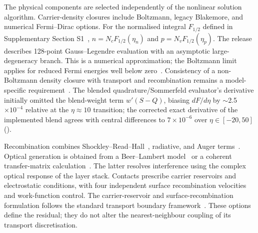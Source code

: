 The physical components are selected independently of the nonlinear
solution algorithm. Carrier-density closures include Boltzmann, legacy
Blakemore, and numerical Fermi--Dirac options. For the normalised integral
$F_{1/2}$ defined in Supplementary Section S1~\cite{dlmf,blakemore1982},
$n=N_cF_{1/2}(\eta_n)$ and $p=N_vF_{1/2}(\eta_p)$.
The release describes 128-point Gauss--Legendre evaluation with an
asymptotic large-degeneracy branch. This is a numerical approximation;
the Boltzmann limit applies for reduced Fermi energies well below
zero~\cite{blakemore1982}.
Consistency of a non-Boltzmann density closure with transport and
recombination remains a model-specific requirement~\cite{farrell2021}.
The blended quadrature/Sommerfeld evaluator's derivative initially
omitted the blend-weight term $w'(S-Q)$, biasing $dF/d\eta$ by
$\sim$2.5$\times10^{-4}$ relative at the $\eta\approx10$ transition;
the corrected exact derivative of the implemented blend agrees with
central differences to $7\times10^{-6}$ over $\eta\in[-20,50]$
().

Recombination combines Shockley--Read--Hall~\cite{shockleyread1952,hall1952},
radiative, and Auger terms~\cite{gaury2019}.
Optical generation is obtained from a Beer--Lambert model~\cite{mann2022partial} or a coherent
transfer-matrix calculation~\cite{byrnes2016}. The latter resolves
interference using the complex optical response of the layer stack.
Contacts prescribe carrier reservoirs and electrostatic conditions, with
four independent surface recombination velocities and work-function
control. The carrier-reservoir and surface-recombination formulation
follows the standard transport boundary framework~\cite{gaury2019,mann2022partial}.
These options define the residual; they do not alter the
nearest-neighbour coupling of its transport discretisation.

